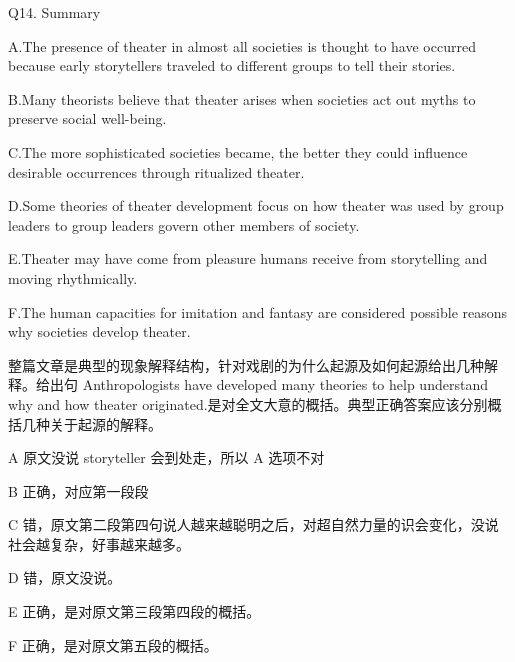 \begin{blk}
  \begin{qst}
    Q14. Summary
  \end{qst}

  \begin{chc}
    A.The presence of theater in almost all societies is thought to have occurred because early storytellers traveled to different groups to tell their stories.

    B.Many theorists believe that theater arises when societies act out myths to preserve social well-being.

    C.The more sophisticated societies became, the better they could influence desirable occurrences through ritualized theater.

    D.Some theories of theater development focus on how theater was used by group leaders to group leaders govern other members of society.

    E.Theater may have come from pleasure humans receive from storytelling and moving rhythmically.

    F.The human capacities for imitation and fantasy are considered possible reasons why societies develop theater.
  \end{chc}

  \begin{nlz}
    整篇文章是典型的现象解释结构，针对戏剧的为什么起源及如何起源给出几种解释。给出句 Anthropologists have developed many theories to help understand why and how theater originated.是对全文大意的概括。典型正确答案应该分别概括几种关于起源的解释。

    A 原文没说 storyteller 会到处走，所以 A 选项不对

    B 正确，对应第一段段

    C 错，原文第二段第四句说人越来越聪明之后，对超自然力量的识会变化，没说社会越复杂，好事越来越多。

    D 错，原文没说。

    E 正确，是对原文第三段第四段的概括。

    F 正确，是对原文第五段的概括。
  \end{nlz}
\end{blk}
